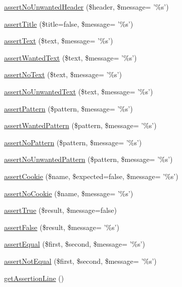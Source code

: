 \begin{DoxyCompactItemize}
\item 
\hyperlink{class_web_test_case_aa12793f1d62d25ae5748063e26a9a513}{assertNoUnwantedHeader} (\$header, \$message= '\%s')
\item 
\hyperlink{class_web_test_case_a8639e24b9991384e695dbe58719bc6b8}{assertTitle} (\$title=false, \$message= '\%s')
\item 
\hyperlink{class_web_test_case_aa458bde36e4dd8038e76974c42fe4822}{assertText} (\$text, \$message= '\%s')
\item 
\hyperlink{class_web_test_case_aba9b544e11cbfdd2e34ec34fefed908a}{assertWantedText} (\$text, \$message= '\%s')
\item 
\hyperlink{class_web_test_case_a1a2b021f72bbc8ec114df0558b882bf6}{assertNoText} (\$text, \$message= '\%s')
\item 
\hyperlink{class_web_test_case_ad05b092ba3b7e8f70c640504ec57538f}{assertNoUnwantedText} (\$text, \$message= '\%s')
\item 
\hyperlink{class_web_test_case_afb9fdc739351627f08f50412a5313f0a}{assertPattern} (\$pattern, \$message= '\%s')
\item 
\hyperlink{class_web_test_case_adfb5d7b168c179976f9aee9447e914e9}{assertWantedPattern} (\$pattern, \$message= '\%s')
\item 
\hyperlink{class_web_test_case_a9c818bf7a210f58e765cc503e8cb69ea}{assertNoPattern} (\$pattern, \$message= '\%s')
\item 
\hyperlink{class_web_test_case_a3bd8aaa61421d81544c32e617cddbcd1}{assertNoUnwantedPattern} (\$pattern, \$message= '\%s')
\item 
\hyperlink{class_web_test_case_aabfb7913fcd6e94811a9029f848117e8}{assertCookie} (\$name, \$expected=false, \$message= '\%s')
\item 
\hyperlink{class_web_test_case_a5531615ad22f67d48ce596041c43f545}{assertNoCookie} (\$name, \$message= '\%s')
\item 
\hyperlink{class_web_test_case_a13f27b3d3f2db36087e3a5e40299ada0}{assertTrue} (\$result, \$message=false)
\item 
\hyperlink{class_web_test_case_a5e382bdb9f868a57664882f71fbff183}{assertFalse} (\$result, \$message= '\%s')
\item 
\hyperlink{class_web_test_case_adb76e8a343c2a422654b3d464e95bf94}{assertEqual} (\$first, \$second, \$message= '\%s')
\item 
\hyperlink{class_web_test_case_a09e9b91f3e29ff7f36be218413238f73}{assertNotEqual} (\$first, \$second, \$message= '\%s')
\item 
\hyperlink{class_web_test_case_a4fa60ab738d6c9ada4a4199698549fd2}{getAssertionLine} ()
\end{DoxyCompactItemize}
